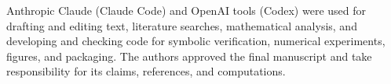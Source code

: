 \documentclass[pdflatex,sn-mathphys-num]{sn-jnl}
\theoremstyle{thmstyleone}
\theoremstyle{thmstylethree}
\theoremstyle{thmstyletwo}
\begin{document}
Anthropic Claude (Claude Code) and OpenAI tools (Codex) were used for drafting and editing text, literature searches, mathematical analysis, and developing and checking code for symbolic verification, numerical experiments, figures, and packaging. The authors approved the final manuscript and take responsibility for its claims, references, and computations.

\renewcommand{\bibpreamble}{\interlinepenalty=10000}

\end{document}

